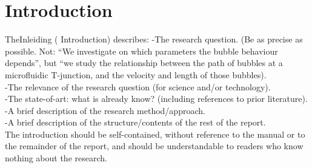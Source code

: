 \section{Introduction}
TheInleiding ( Introduction) describes:   -The  research  question.  (Be  as  precise  as  possible.  Not:  “We  investigate  on  which  parameters  the  bubble  behaviour  depends”,  but  “we  study  the  relationship  between  the  path  of  bubbles  at  a  microfluidic T-junction, and the velocity and length of those bubbles).\\-The relevance of the research question (for science and/or technology).\\-The state-of-art: what is already know? (including references to prior literature).\\-A brief description of the research method/approach.\\-A brief description of the structure/contents of the rest of the report.\\The  introduction  should  be  self-contained,  without  reference  to  the  manual  or  to  the  remainder  of  the  report, and should be understandable to readers who know nothing about the research. 
